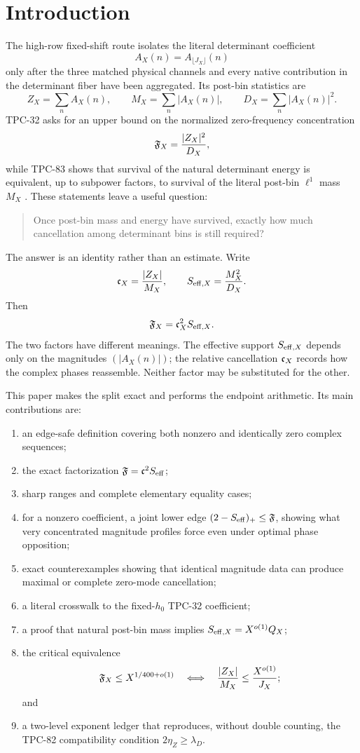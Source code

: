 \section{Introduction}
\label{sec:introduction}

The high-row fixed-shift route isolates the literal determinant
coefficient
\[
 A_X(n)=A_{\lfloor J_X\rfloor}(n)
\]
only after the three matched physical channels and every native
contribution in the determinant fiber have been aggregated.  Its
post-bin statistics are
\[
 Z_X=\sum_nA_X(n),\qquad
 M_X=\sum_n|A_X(n)|,\qquad
 D_X=\sum_n|A_X(n)|^2.
\]
TPC-32 asks for an upper bound on the normalized zero-frequency
concentration
\[
 \mathfrak F_X=\frac{|Z_X|^2}{D_X},
\]
while TPC-83 shows that survival of the natural determinant energy
is equivalent, up to subpower factors, to survival of the literal
post-bin \(\ell^1\) mass \(M_X\)
\citep{WangTPC32,WangTPC83}.  These statements leave a useful
question:

\begin{quote}
Once post-bin mass and energy have survived, exactly how much
cancellation among determinant bins is still required?
\end{quote}

The answer is an identity rather than an estimate.  Write
\[
 \mathfrak c_X=\frac{|Z_X|}{M_X},
 \qquad
 S_{\mathrm{eff},X}=\frac{M_X^2}{D_X}.
\]
Then
\[
 \mathfrak F_X=\mathfrak c_X^2S_{\mathrm{eff},X}.
\]
The two factors have different meanings.  The effective support
\(S_{\mathrm{eff},X}\) depends only on the magnitudes
\((|A_X(n)|)\); the relative cancellation \(\mathfrak c_X\) records how
the complex phases reassemble.  Neither factor may be substituted
for the other.

This paper makes the split exact and performs the endpoint
arithmetic.  Its main contributions are:
\begin{enumerate}[label=(\roman*),leftmargin=2.2em]
\item an edge-safe definition covering both nonzero and identically
zero complex sequences;
\item the exact factorization
\(\mathfrak F=\mathfrak c^2S_{\mathrm{eff}}\);
\item sharp ranges and complete elementary equality cases;
\item for a nonzero coefficient, a joint lower edge
\((2-S_{\mathrm{eff}})_+\le\mathfrak F\), showing what very concentrated magnitude
profiles force even under optimal phase opposition;
\item exact counterexamples showing that identical magnitude data
can produce maximal or complete zero-mode cancellation;
\item a literal crosswalk to the fixed-\(h_0\) TPC-32 coefficient;
\item a proof that natural post-bin mass implies
\(S_{\mathrm{eff},X}=X^{o(1)}Q_X\);
\item the critical equivalence
\[
 \mathfrak F_X\le X^{1/400+o(1)}
 \quad\Longleftrightarrow\quad
 \frac{|Z_X|}{M_X}\le\frac{X^{o(1)}}{J_X};
\]
and
\item a two-level exponent ledger that reproduces, without double
counting, the TPC-82 compatibility condition
\(2\eta_Z\ge\lambda_D\).
\end{enumerate}

